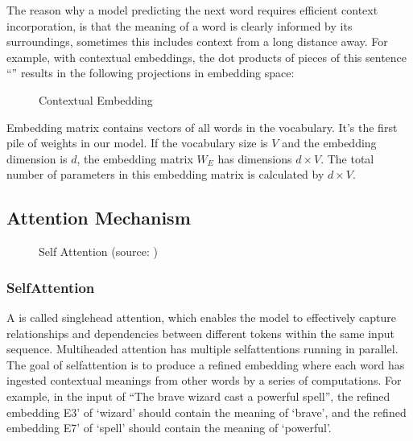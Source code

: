 \documentclass[letterpaper,11pt,english]{sphinxmanual}
\begin{document}
\sphinxAtStartPar
The reason why a model predicting the next word requires efficient
context incorporation, is that the meaning of a word is clearly informed
by its surroundings, sometimes this includes context from a long
distance away. For example, with contextual embeddings, the dot products
of pieces of this sentence “” results in the
following projections in embedding space:

\begin{figure}[htbp]
\centering
\capstart

\noindent{}
\caption{Contextual Embedding}\label{\detokenize{pretraining:id12}}\end{figure}

\sphinxAtStartPar
Embedding matrix contains vectors of all words in the vocabulary. It’s
the first pile of weights in our model. If the vocabulary size is
\(V\) and the embedding dimension is \(d\), the embedding matrix
\(W_E\) has dimensions \(d \times V\). The total number of
parameters in this embedding matrix is calculated by \(d \times V\).


\subsection{Attention Mechanism}
\label{\detokenize{pretraining:attention-mechanism}}
\begin{figure}[htbp]
\centering
\capstart

\noindent{}
\caption{Self Attention (source: )}\label{\detokenize{pretraining:id13}}\end{figure}


\subsubsection{Self\sphinxhyphen{}Attention}
\label{\detokenize{pretraining:self-attention}}
\sphinxAtStartPar
A  is called single\sphinxhyphen{}head attention, which enables the
model to effectively capture relationships and dependencies between
different tokens within the same input sequence. Multi\sphinxhyphen{}headed attention
has multiple self\sphinxhyphen{}attentions running in parallel. The goal of
self\sphinxhyphen{}attention is to produce a refined embedding where each word has
ingested contextual meanings from other words by a series of
computations. For example, in the input of “The brave wizard cast a
powerful spell”, the refined embedding E3’ of ‘wizard’ should contain
the meaning of ‘brave’, and the refined embedding E7’ of ‘spell’ should
contain the meaning of ‘powerful’.
\end{document}
